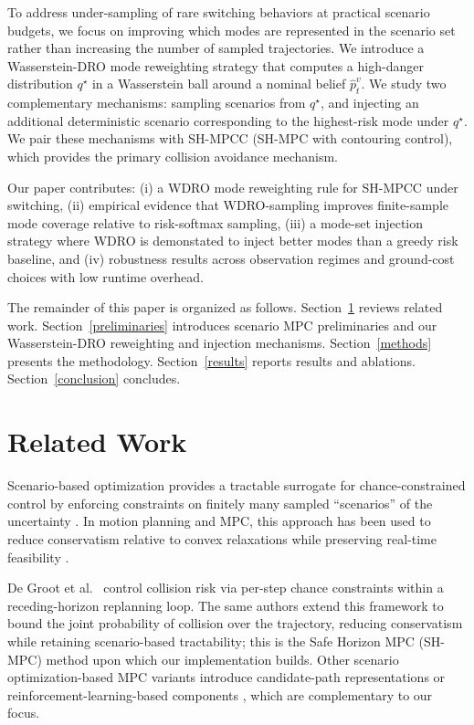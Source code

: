 \documentclass[letterpaper,10pt,conference]{ieeeconf}
\begin{document}
To address under-sampling of rare switching behaviors at practical scenario budgets, we focus on improving which modes are represented in the scenario set rather than increasing the number of sampled trajectories.
We introduce a Wasserstein-DRO mode reweighting strategy that computes a high-danger distribution $q^\star$ in a Wasserstein ball around a nominal belief $\widehat p_t^v$. 
We study two complementary mechanisms: sampling scenarios from $q^\star$, and injecting an additional deterministic scenario corresponding to the highest-risk mode under $q^\star$. 
We pair these mechanisms with SH-MPCC (SH-MPC with contouring control), which provides the primary collision avoidance mechanism.

Our paper contributes: (i) a WDRO mode reweighting rule for SH-MPCC under switching, (ii) empirical evidence that WDRO-sampling improves finite-sample mode coverage relative to risk-softmax sampling, (iii) a mode-set injection strategy where WDRO is demonstated to inject better modes than a greedy risk baseline, and (iv) robustness results across observation regimes and ground-cost choices with low runtime overhead.

The remainder of this paper is organized as follows.
Section~\ref{related} reviews related work.
Section~\ref{preliminaries} introduces scenario MPC preliminaries and our Wasserstein-DRO reweighting and injection mechanisms.
Section~\ref{methods} presents the methodology.
Section~\ref{results} reports results and ablations.
Section~\ref{conclusion} concludes.


\section{Related Work}\label{related}

Scenario-based optimization provides a tractable surrogate for chance-constrained control by enforcing constraints on finitely many sampled ``scenarios'' of the uncertainty \cite{Cal2006ScenarioApproach,Ca2018ScenarioTheory}. In motion planning and MPC, this approach has been used to reduce conservatism relative to convex relaxations while preserving real-time feasibility \cite{de2021ScenarioBasedTraj,degroot2023SBMotionBounded}.

De Groot et al.\ \cite{de2021ScenarioBasedTraj} control collision risk via per-step chance constraints within a receding-horizon replanning loop. The same authors \cite{degroot2023SBMotionBounded} extend this framework to bound the joint probability of collision over the trajectory, reducing conservatism while retaining scenario-based tractability; this is the Safe Horizon MPC (SH-MPC) method upon which our implementation builds. Other scenario optimization-based MPC variants introduce candidate-path representations \cite{Shang2021SceMPC} or reinforcement-learning-based components \cite{Jekl2025SceVelPlanning}, which are complementary to our focus.
\end{document}
